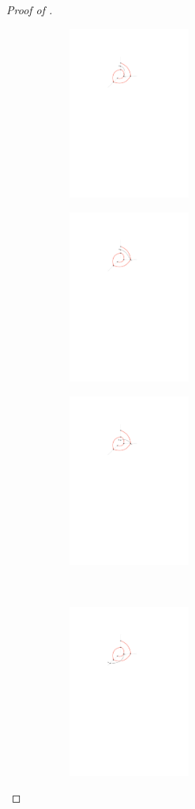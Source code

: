 \documentclass{patmorin}
\begin{document}
\begin{proof}[Proof of ]
 \renewcommand{\thesubfigure}{\arabic{subfigure}}
  \begin{figure}
    \begin{center}
    \begin{subfigure}[t]{0.3\hsize}\includegraphics[width=40mm]{figs/2layermaximum-1} \caption{}\end{subfigure}
    \begin{subfigure}[t]{0.3\hsize}\includegraphics[width=40mm]{figs/2layermaximum-2} \caption{}\end{subfigure}
    \begin{subfigure}[t]{0.3\hsize}\includegraphics[width=40mm]{figs/2layermaximum-3} \caption{}\end{subfigure}
    \\[2ex]
    \begin{subfigure}[t]{0.4\hsize}\includegraphics[width=40mm]{figs/2layermaximum-4} \caption{}\end{subfigure}

\end{center}
\end{figure}
\end{proof}
\end{document}
